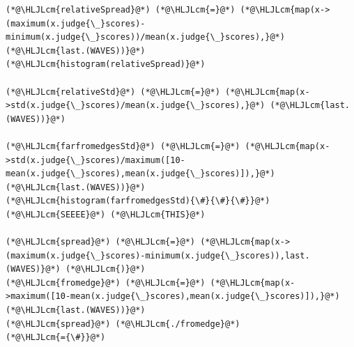 \documentclass[12pt,a4paper]{article}
\newcommand{\HLJLcm}[1]{\textcolor[RGB]{153,153,119}{\textit{#1}}}
\begin{document}
\begin{lstlisting}
(*@\HLJLcm{relativeSpread}@*) (*@\HLJLcm{=}@*) (*@\HLJLcm{map(x->(maximum(x.judge{\_}scores)-minimum(x.judge{\_}scores))/mean(x.judge{\_}scores),}@*) (*@\HLJLcm{last.(WAVES))}@*)
(*@\HLJLcm{histogram(relativeSpread)}@*)

(*@\HLJLcm{relativeStd}@*) (*@\HLJLcm{=}@*) (*@\HLJLcm{map(x->std(x.judge{\_}scores)/mean(x.judge{\_}scores),}@*) (*@\HLJLcm{last.(WAVES))}@*)

(*@\HLJLcm{farfromedgesStd}@*) (*@\HLJLcm{=}@*) (*@\HLJLcm{map(x->std(x.judge{\_}scores)/maximum([10-mean(x.judge{\_}scores),mean(x.judge{\_}scores)]),}@*) (*@\HLJLcm{last.(WAVES))}@*)
(*@\HLJLcm{histogram(farfromedgesStd){\#}{\#}{\#}}@*) (*@\HLJLcm{SEEEE}@*) (*@\HLJLcm{THIS}@*)

(*@\HLJLcm{spread}@*) (*@\HLJLcm{=}@*) (*@\HLJLcm{map(x->(maximum(x.judge{\_}scores)-minimum(x.judge{\_}scores)),last.(WAVES)}@*) (*@\HLJLcm{)}@*)
(*@\HLJLcm{fromedge}@*) (*@\HLJLcm{=}@*) (*@\HLJLcm{map(x->maximum([10-mean(x.judge{\_}scores),mean(x.judge{\_}scores)]),}@*) (*@\HLJLcm{last.(WAVES))}@*)
(*@\HLJLcm{spread}@*) (*@\HLJLcm{./fromedge}@*)
(*@\HLJLcm{={\#}}@*)
\end{lstlisting}
\end{document}
